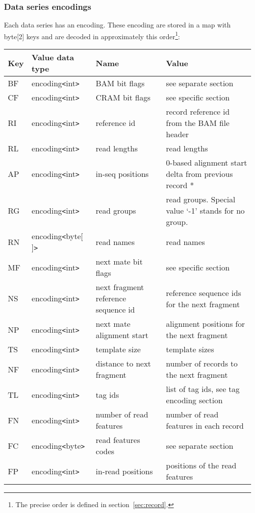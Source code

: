\documentclass[a4paper]{article}
\begin{document}
\subsubsection*{Data series encodings}

Each data series has an encoding. These encoding are stored in a map with byte[2] 
keys and are decoded in approximately this order\footnote{The precise order is defined in section~\ref{sec:record}.}:

\begin{threeparttable}[t]
\begin{tabular}{|l|l|>{\raggedright}p{100pt}|>{\raggedright}p{220pt}|}
\hline
\textbf{Key} & \textbf{Value data type} & \textbf{Name} & \textbf{Value}\tabularnewline
\hline
BF & encoding\texttt{<}int\texttt{>} & BAM bit flags & see separate section\tabularnewline
\hline
CF & encoding\texttt{<}int\texttt{>} & CRAM bit flags & see specific section\tabularnewline
\hline
RI & encoding\texttt{<}int\texttt{>} & reference id & record reference id from
the BAM file header\tabularnewline
\hline
RL & encoding\texttt{<}int\texttt{>} & read lengths & read lengths\tabularnewline
\hline
AP & encoding\texttt{<}int\texttt{>} & in-seq positions & 0-based alignment start
delta from previous record *\tabularnewline
\hline
RG & encoding\texttt{<}int\texttt{>} & read groups & read groups. Special value 
`-1' stands for no group.\tabularnewline
\hline
RN\tnote{a} & encoding\texttt{<}byte[ ]\texttt{>} & read names & read names\tabularnewline
\hline
MF & encoding\texttt{<}int\texttt{>} & next mate bit flags & see specific section\tabularnewline
\hline
NS & encoding\texttt{<}int\texttt{>} & next fragment reference sequence id & reference 
sequence ids for the next fragment \tabularnewline
\hline
NP & encoding\texttt{<}int\texttt{>} & next mate alignment start & alignment positions 
for the next fragment\tabularnewline
\hline
TS & encoding\texttt{<}int\texttt{>} & template size & template sizes\tabularnewline
\hline
NF & encoding\texttt{<}int\texttt{>} & distance to next fragment & number of records
to the next fragment\tnote{b}\tabularnewline
\hline
TL\tnote{c} & encoding\texttt{<}int\texttt{>} & tag ids  & list of tag ids, see tag encoding
section\tabularnewline
\hline
FN & encoding\texttt{<}int\texttt{>} & number of read features & number of read
features in each record\tabularnewline
\hline
FC & encoding\texttt{<}byte\texttt{>} & read features codes & see separate section\tabularnewline
\hline
FP & encoding\texttt{<}int\texttt{>} & in-read positions & positions of the read
features\tabularnewline
\hline

\end{tabular}
\end{threeparttable}
\end{document}
